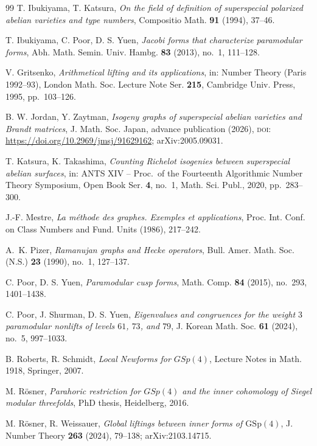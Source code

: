\documentclass[11pt]{amsart}
\providecommand{\doi}[1]{\textsc{doi:}\,\url{https://doi.org/#1}}
\theoremstyle{plain}
\theoremstyle{definition}
\newcommand{\GSp}{\mathrm{GSp}}
\begin{document}
\begin{thebibliography}{99}
		 T. Ibukiyama, T. Katsura, \emph{On the field of
			definition of superspecial polarized abelian varieties and type numbers},
		Compositio Math. \textbf{91} (1994), 37--46.
		
		 T. Ibukiyama, C. Poor, D. S. Yuen, \emph{Jacobi forms that
			characterize paramodular forms}, Abh. Math. Semin. Univ. Hambg. \textbf{83}
		(2013), no.~1, 111--128.
		
		 V. Gritsenko, \emph{Arithmetical lifting and its
			applications}, in: Number Theory (Paris 1992--93), London Math. Soc. Lecture
		Note Ser. \textbf{215}, Cambridge Univ. Press, 1995, pp.~103--126.
		
		 B. W. Jordan, Y. Zaytman, \emph{Isogeny graphs of
			superspecial abelian varieties and Brandt matrices}, J. Math. Soc. Japan,
		advance publication (2026), \doi{10.2969/jmsj/91629162}; arXiv:2005.09031.
		
		 T. Katsura, K. Takashima, \emph{Counting Richelot
			isogenies between superspecial abelian surfaces}, in: ANTS XIV -- Proc.\ of the
		Fourteenth Algorithmic Number Theory Symposium, Open Book Ser. \textbf{4}, no.~1,
		Math. Sci. Publ., 2020, pp.~283--300.
		
		 J.-F. Mestre, \emph{La m\'ethode des graphes. Exemples et
			applications}, Proc. Int. Conf. on Class Numbers and Fund. Units (1986),
		217--242.
		
		 A.~K. Pizer, \emph{Ramanujan graphs and Hecke operators},
		Bull. Amer. Math. Soc. (N.S.) \textbf{23} (1990), no.~1, 127--137.
		
		 C. Poor, D. S. Yuen, \emph{Paramodular cusp forms},
		Math. Comp. \textbf{84} (2015), no.~293, 1401--1438.
		
		 C. Poor, J. Shurman, D. S. Yuen, \emph{Eigenvalues and
			congruences for the weight $3$ paramodular nonlifts of levels $61$, $73$, and
			$79$}, J. Korean Math. Soc. \textbf{61} (2024), no.~5, 997--1033.
		
		 B. Roberts, R. Schmidt, \emph{Local Newforms for
			$GSp(4)$}, Lecture Notes in Math. 1918, Springer, 2007.
		
		 M. R\"osner, \emph{Parahoric restriction for $GSp(4)$ and
			the inner cohomology of Siegel modular threefolds}, PhD thesis, Heidelberg, 2016.
		
		 M. R\"osner, R. Weissauer, \emph{Global
			liftings between inner forms of $\GSp(4)$}, J. Number Theory \textbf{263}
		(2024), 79--138; arXiv:2103.14715.
		

\end{thebibliography}
\end{document}
